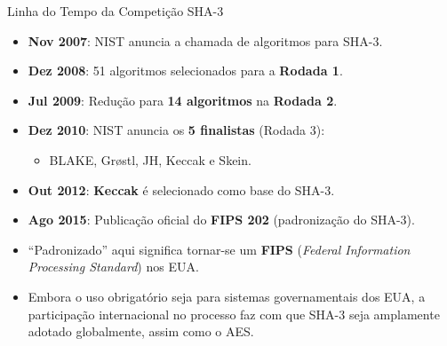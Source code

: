 \documentclass{beamer}
\begin{document}
\begin{frame}{Linha do Tempo da Competição SHA-3}
  \begin{itemize}
    \item \textbf{Nov 2007}: NIST anuncia a chamada de algoritmos para SHA-3.
    \item \textbf{Dez 2008}: 51 algoritmos selecionados para a \textbf{Rodada 1}.
    \item \textbf{Jul 2009}: Redução para \textbf{14 algoritmos} na \textbf{Rodada 2}.
    \item \textbf{Dez 2010}: NIST anuncia os \textbf{5 finalistas} (Rodada 3):
      \begin{itemize}
        \item BLAKE, Grøstl, JH, Keccak e Skein.
      \end{itemize}
    \item \textbf{Out 2012}: \textbf{Keccak} é selecionado como base do SHA-3.
    \item \textbf{Ago 2015}: Publicação oficial do \textbf{FIPS 202} (padronização do SHA-3).
  \end{itemize}

  \vspace{0.3cm}
  \begin{itemize}
    \item “Padronizado” aqui significa tornar-se um \textbf{FIPS} (\textit{Federal Information Processing Standard}) nos EUA.
    \item Embora o uso obrigatório seja para sistemas governamentais dos EUA, a participação internacional no processo faz com que SHA-3 seja amplamente adotado globalmente, assim como o AES.
  \end{itemize}
\end{frame}
\end{document}
